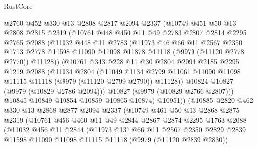 \begin{lexlean}{RustCore}
\begin{coremodule}
          @2760
          @452
          @330
          @13
          @2808
          @2817
          @2094
          @2337
          (@10749
            @451
            @50
            @13
            @2808
            @2815
            @2319
            (@10761
              @448
              @450
              @11
              @49
              @2783
              @2807
              @2814
              @2295
              @2765
              @2088
              (@11032
                @448
                @11
                @2783
                (@11973
                  @46
                  @66
                  @11
                  @2567
                  @2350
                  @1713
                  @2778
                  @11598
                  @11090
                  @11098
                  @11878
                  @11118
                  (@9979 (@11120 @2778 @2770))
                  @11128))
              (@10761
                @343
                @228
                @11
                @30
                @2804
                @2094
                @2185
                @2295
                @1219
                @2088
                (@11034
                  @2804
                  (@11049
                    @1134
                    @2799
                    @11061
                    @11090
                    @11098
                    @11115
                    @11118
                    (@9979 (@11120 @2799 @2790))
                    @11128))
                @10824
                @10827
                (@9979 (@10829 @2786 @2094)))
              @10827
              (@9979 (@10829 @2766 @2807)))
            @10845
            @10849
            @10854
            @10859
            @10865
            @10874)
          @10951))
      (@10885
        @2820
        @462
        @330
        @13
        @2868
        @2877
        @2094
        @2337
        (@10749
          @461
          @50
          @13
          @2868
          @2875
          @2319
          (@10761
            @456
            @460
            @11
            @49
            @2844
            @2867
            @2874
            @2295
            @1763
            @2088
            (@11032
              @456
              @11
              @2844
              (@11973
                @137
                @66
                @11
                @2567
                @2350
                @2829
                @2839
                @11598
                @11090
                @11098
                @11115
                @11118
                (@9979 (@11120 @2839 @2830))

\end{coremodule}
\end{lexlean}
